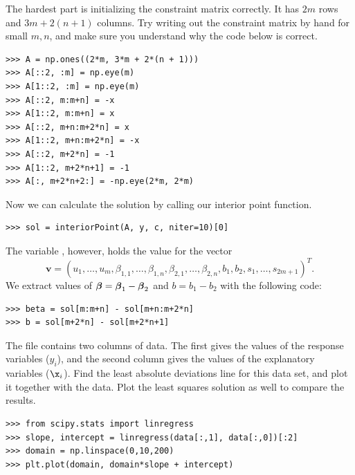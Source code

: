 The hardest part is initializing the constraint matrix correctly.
It has $2m$ rows and $3m + 2(n+1)$ columns.
Try writing out the constraint matrix by hand for small $m, n$, and make sure you understand why the code below is correct.
\begin{lstlisting}
>>> A = np.ones((2*m, 3*m + 2*(n + 1)))
>>> A[::2, :m] = np.eye(m)
>>> A[1::2, :m] = np.eye(m)
>>> A[::2, m:m+n] = -x
>>> A[1::2, m:m+n] = x
>>> A[::2, m+n:m+2*n] = x
>>> A[1::2, m+n:m+2*n] = -x
>>> A[::2, m+2*n] = -1
>>> A[1::2, m+2*n+1] = -1
>>> A[:, m+2*n+2:] = -np.eye(2*m, 2*m)
\end{lstlisting}

Now we can calculate the solution by calling our interior point function.
\begin{lstlisting}
>>> sol = interiorPoint(A, y, c, niter=10)[0]
\end{lstlisting}

The variable , however, holds the value for the vector
\[
\mathbf{v} = (u_1,\ldots, u_m, \beta_{1,1},\ldots, \beta_{1,n}, \beta_{2,1},\ldots, \beta_{2,n}, b_1, b_2, s_1,\ldots,s_{2m+1})^T.
\]
We extract values of $\boldsymbol{\beta} = \boldsymbol{\beta}_1-\boldsymbol{\beta}_2$ and $b = b_1 - b_2$ with the following code:
\begin{lstlisting}
>>> beta = sol[m:m+n] - sol[m+n:m+2*n]
>>> b = sol[m+2*n] - sol[m+2*n+1]
\end{lstlisting}

\begin{problem} %
The file  contains two columns of data.
The first gives the values of the response variables ($y_i$), and the second column gives the values of the explanatory variables ($\x_i$).
Find the least absolute deviations line for this data set, and plot it together with the data.
Plot the least squares solution as well to compare the results.
\begin{lstlisting}
>>> from scipy.stats import linregress
>>> slope, intercept = linregress(data[:,1], data[:,0])[:2]
>>> domain = np.linspace(0,10,200)
>>> plt.plot(domain, domain*slope + intercept)
\end{lstlisting}
\end{problem}
